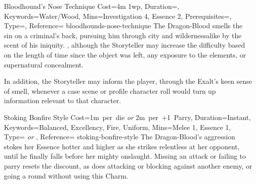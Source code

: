 \begin{Charm}{Bloodhound's Nose Technique}{%
    Cost=4m 1wp,
    Duration={},
    Keywords=Water/Wood,
    Mins={Investigation 4, Essence 2},
    Prerequisites=,
    Type=\SimpleType,
    Reference=\cite*[p.~199]{db}
}{bloodhounds-nose-technique}
    The Dragon-Blood smells the sin on a criminal's back, pursuing him through city
    and wildernessalike by the scent of his iniquity. , although the Storyteller may increase the difficulty based on
    the length of time since the object was left, any exposure to the elements, or
    supernatural concealment. 

     In addition, the Storyteller may inform the player,
    through the Exalt's keen sense of smell, whenever a case scene or profile
    character roll would turn up information relevant to that character.
\end{Charm}



\DocumentColumnBreak
{}

\begin{Charm}{Stoking Bonfire Style}{%
    Cost={1m~per~die \emph{or} 2m~per~+1~Parry},
    Duration=Instant,
    Keywords={Balanced, Excellency, Fire, Uniform},
    Mins={Melee 1, Essence 1},
    Type={\SupplementalType{} \emph{or} \ReflexiveType},
    Reference=\cite*[p.~225]{db}
}{stoking-bonfire-style}
    The Dragon-Blood's aggression stokes her Essence hotter and higher as she
    strikes relentless at her opponent, until he finally falls before her mighty
    onslaught.  Missing an
    attack or failing to parry resets the discount, as does attacking or blocking
    against another enemy, or going a round without using this Charm.
\end{Charm}



